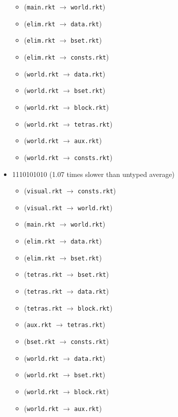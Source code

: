 \documentclass{article}
\newcommand{\mono}[1]{\texttt{#1}}
\begin{document}
\begin{itemize}
\begin{itemize}
  \item (\mono{main.rkt} $\rightarrow$ \mono{world.rkt})
  \item (\mono{elim.rkt} $\rightarrow$ \mono{data.rkt})
  \item (\mono{elim.rkt} $\rightarrow$ \mono{bset.rkt})
  \item (\mono{elim.rkt} $\rightarrow$ \mono{consts.rkt})
  \item (\mono{world.rkt} $\rightarrow$ \mono{data.rkt})
  \item (\mono{world.rkt} $\rightarrow$ \mono{bset.rkt})
  \item (\mono{world.rkt} $\rightarrow$ \mono{block.rkt})
  \item (\mono{world.rkt} $\rightarrow$ \mono{tetras.rkt})
  \item (\mono{world.rkt} $\rightarrow$ \mono{aux.rkt})
  \item (\mono{world.rkt} $\rightarrow$ \mono{consts.rkt})
  \end{itemize}
\item 1110101010 (1.07 times slower than untyped average)
  \begin{itemize}
  \item (\mono{visual.rkt} $\rightarrow$ \mono{consts.rkt})
  \item (\mono{visual.rkt} $\rightarrow$ \mono{world.rkt})
  \item (\mono{main.rkt} $\rightarrow$ \mono{world.rkt})
  \item (\mono{elim.rkt} $\rightarrow$ \mono{data.rkt})
  \item (\mono{elim.rkt} $\rightarrow$ \mono{bset.rkt})
  \item (\mono{tetras.rkt} $\rightarrow$ \mono{bset.rkt})
  \item (\mono{tetras.rkt} $\rightarrow$ \mono{data.rkt})
  \item (\mono{tetras.rkt} $\rightarrow$ \mono{block.rkt})
  \item (\mono{aux.rkt} $\rightarrow$ \mono{tetras.rkt})
  \item (\mono{bset.rkt} $\rightarrow$ \mono{consts.rkt})
  \item (\mono{world.rkt} $\rightarrow$ \mono{data.rkt})
  \item (\mono{world.rkt} $\rightarrow$ \mono{bset.rkt})
  \item (\mono{world.rkt} $\rightarrow$ \mono{block.rkt})
  \item (\mono{world.rkt} $\rightarrow$ \mono{aux.rkt})
  \end{itemize}

\end{itemize}
\end{document}
